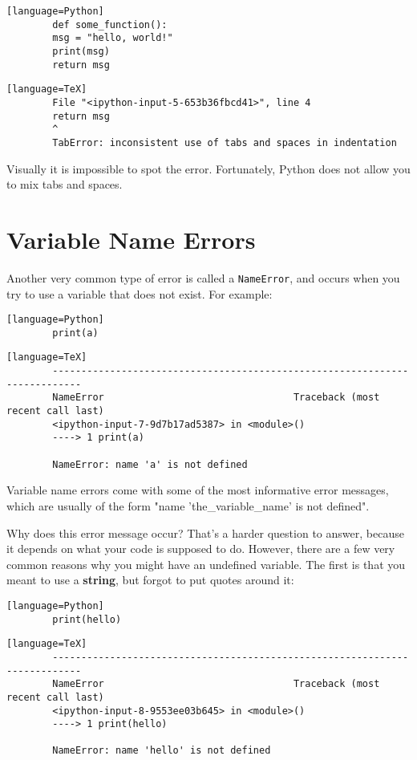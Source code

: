 \documentclass{article}
\begin{document}
	\begin{verbatim}[language=Python]
		def some_function():
		msg = "hello, world!"
		print(msg)
		return msg
	\end{verbatim}
	
	\begin{verbatim}[language=TeX]
		File "<ipython-input-5-653b36fbcd41>", line 4
		return msg
		^
		TabError: inconsistent use of tabs and spaces in indentation
	\end{verbatim}
	
	Visually it is impossible to spot the error. Fortunately, Python does not allow you to mix tabs and spaces.
	
	\section{Variable Name Errors}
	
	Another very common type of error is called a \texttt{NameError}, and occurs when you try to use a variable that does not exist. For example:
	
	\begin{verbatim}[language=Python]
		print(a)
	\end{verbatim}
	
	\begin{verbatim}[language=TeX]
		---------------------------------------------------------------------------
		NameError                                 Traceback (most recent call last)
		<ipython-input-7-9d7b17ad5387> in <module>()
		----> 1 print(a)
		
		NameError: name 'a' is not defined
	\end{verbatim}
	
	Variable name errors come with some of the most informative error messages, which are usually of the form "name 'the\_variable\_name' is not defined".
	
	Why does this error message occur? That's a harder question to answer, because it depends on what your code is supposed to do. However, there are a few very common reasons why you might have an undefined variable. The first is that you meant to use a \textbf{string}, but forgot to put quotes around it:
	
	\begin{verbatim}[language=Python]
		print(hello)
	\end{verbatim}
	
	\begin{verbatim}[language=TeX]
		---------------------------------------------------------------------------
		NameError                                 Traceback (most recent call last)
		<ipython-input-8-9553ee03b645> in <module>()
		----> 1 print(hello)
		
		NameError: name 'hello' is not defined
	\end{verbatim}
	
\end{document}
